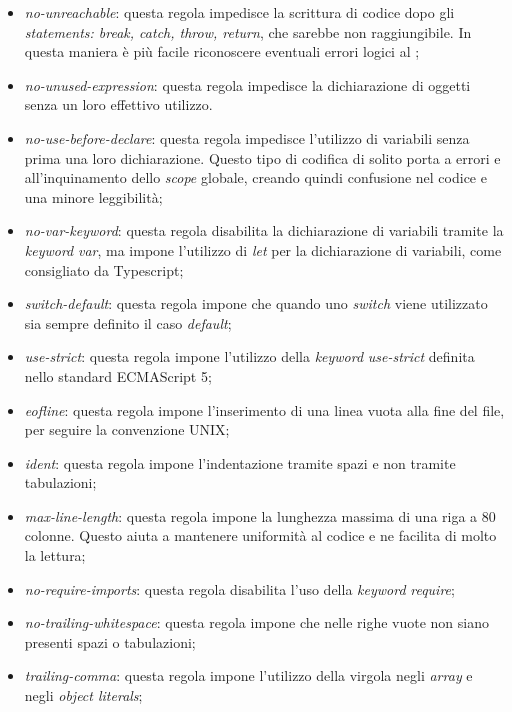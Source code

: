 \begin{itemize}
                \item \textit{no-unreachable}: questa regola impedisce la scrittura di codice dopo gli \textit{statements: break, catch, throw, return}, che sarebbe non raggiungibile. In questa maniera \`e pi\`u facile riconoscere eventuali errori logici al ;
                \item \textit{no-unused-expression}: questa regola impedisce la dichiarazione di oggetti senza un loro effettivo utilizzo. 
                \item \textit{no-use-before-declare}: questa regola impedisce l'utilizzo di variabili senza prima una loro dichiarazione. Questo tipo di codifica di solito porta a errori e all'inquinamento dello \textit{scope} globale, creando quindi confusione nel codice e una minore leggibilit\`a;
                \item \textit{no-var-keyword}: questa regola disabilita la dichiarazione di variabili tramite la \textit{keyword} \textit{var}, ma impone l'utilizzo di \textit{let} per la dichiarazione di variabili, come consigliato da Typescript;
                \item \textit{switch-default}: questa regola impone che quando uno \textit{switch} viene utilizzato sia sempre definito il caso \textit{default};
                \item \textit{use-strict}: questa regola impone l'utilizzo della \textit{keyword} \textit{use-strict} definita nello standard ECMAScript 5;
                \item \textit{eofline}: questa regola impone l'inserimento di una linea vuota alla fine del file, per seguire la convenzione UNIX;
                \item \textit{ident}: questa regola impone l'indentazione tramite spazi e non tramite tabulazioni;
                \item \textit{max-line-length}: questa regola impone la lunghezza massima di una riga a 80 colonne. Questo aiuta a mantenere uniformit\`a al codice e ne facilita di molto la lettura;
                \item \textit{no-require-imports}: questa regola disabilita l'uso della \textit{keyword} \textit{require};
                \item \textit{no-trailing-whitespace}: questa regola impone che nelle righe vuote non siano presenti spazi o tabulazioni;
                \item \textit{trailing-comma}: questa regola impone l'utilizzo della virgola negli \textit{array} e negli \textit{object literals};

\end{itemize}

